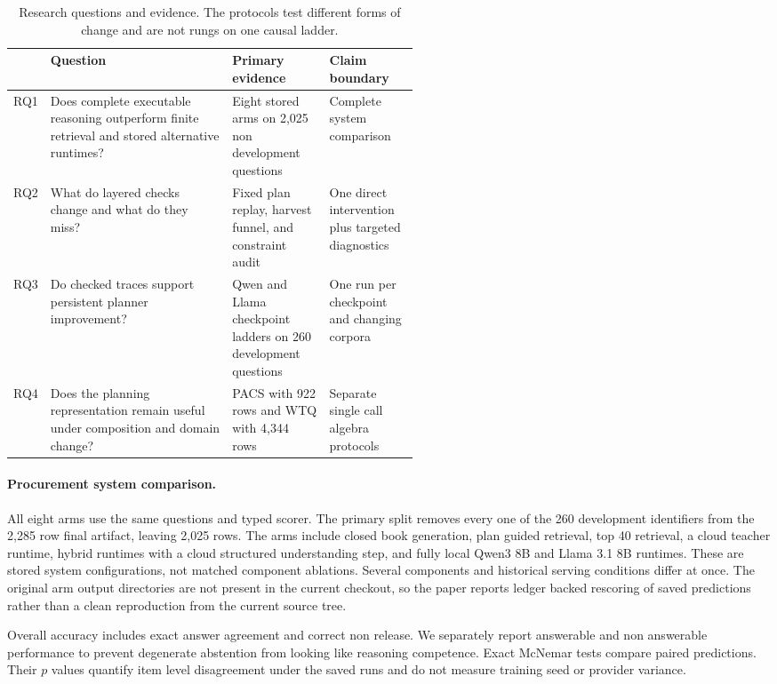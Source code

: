 \documentclass{article}
\begin{document}
\begin{table}[t]
  \centering
  \caption{Research questions and evidence.  The protocols test different forms of change and are
  not rungs on one causal ladder.}
  \label{tab:rqs}
  \small
  \begin{tabularx}{\linewidth}{p{0.07\linewidth}X p{0.24\linewidth}p{0.22\linewidth}}
    \toprule
    & Question & Primary evidence & Claim boundary \\
    \midrule
    RQ1 & Does complete executable reasoning outperform finite retrieval and stored alternative
    runtimes? & Eight stored arms on 2,025 non development questions & Complete system comparison \\
    RQ2 & What do layered checks change and what do they miss? & Fixed plan replay, harvest funnel,
    and constraint audit & One direct intervention plus targeted diagnostics \\
    RQ3 & Do checked traces support persistent planner improvement? & Qwen and Llama checkpoint
    ladders on 260 development questions & One run per checkpoint and changing corpora \\
    RQ4 & Does the planning representation remain useful under composition and domain change? &
    PACS with 922 rows and WTQ with 4,344 rows & Separate single call algebra protocols \\
    \bottomrule
  \end{tabularx}
\end{table}

\paragraph{Procurement system comparison.}
All eight arms use the same questions and typed scorer.  The primary split removes every one of the
260 development identifiers from the 2,285 row final artifact, leaving 2,025 rows.  The arms include
closed book generation, plan guided retrieval, top 40 retrieval, a cloud teacher runtime, hybrid
runtimes with a cloud structured understanding step, and fully local Qwen3 8B and Llama 3.1 8B
runtimes.  These are stored system configurations, not matched component ablations.  Several
components and historical serving conditions differ at once.  The original arm output directories
are not present in the current checkout, so the paper reports ledger backed rescoring of saved
predictions rather than a clean reproduction from the current source tree.

Overall accuracy includes exact answer agreement and correct non release.  We separately report
answerable and non answerable performance to prevent degenerate abstention from looking like
reasoning competence.  Exact McNemar tests compare paired predictions.  Their $p$ values quantify
item level disagreement under the saved runs and do not measure training seed or provider variance.
\end{document}
